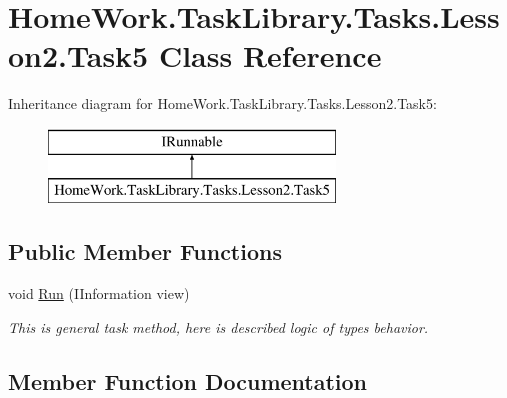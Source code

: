 \hypertarget{class_home_work_1_1_task_library_1_1_tasks_1_1_lesson2_1_1_task5}{}\section{Home\+Work.\+Task\+Library.\+Tasks.\+Lesson2.\+Task5 Class Reference}
\label{class_home_work_1_1_task_library_1_1_tasks_1_1_lesson2_1_1_task5}
Inheritance diagram for Home\+Work.\+Task\+Library.\+Tasks.\+Lesson2.\+Task5\+:\begin{figure}[H]
\begin{center}
\leavevmode
\includegraphics[height=2.000000cm]{class_home_work_1_1_task_library_1_1_tasks_1_1_lesson2_1_1_task5}
\end{center}
\end{figure}
\subsection*{Public Member Functions}
\begin{DoxyCompactItemize}
\item 
void \mbox{\hyperlink{class_home_work_1_1_task_library_1_1_tasks_1_1_lesson2_1_1_task5_a98d23c0ecf925254332790bbbaa9af80}{Run}} (I\+Information view)
\begin{DoxyCompactList}\small\item\em This is general task method, here is described logic of types behavior. \end{DoxyCompactList}\end{DoxyCompactItemize}


\subsection{Member Function Documentation}
\mbox{\label{class_home_work_1_1_task_library_1_1_tasks_1_1_lesson2_1_1_task5_a98d23c0ecf925254332790bbbaa9af80}} 
